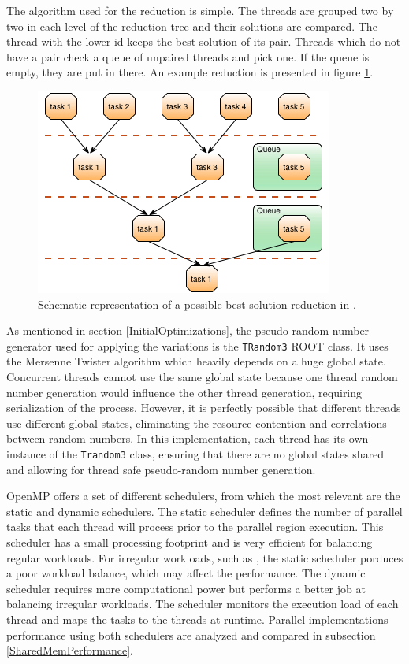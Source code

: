 The algorithm used for the reduction is simple. The threads are grouped two by two in each level of the reduction tree and their solutions are compared. The thread with the lower id keeps the best solution of its pair. Threads which do not have a pair check a queue of unpaired threads and pick one. If the queue is empty, they are put in there. An example reduction is presented in figure \ref{fig:Reduction}.

\begin{figure}[!htp]
	\begin{center}
		\includegraphics[scale=0.7]{../../common/img/parallel_reduction_example.png}
		\caption{Schematic representation of a possible best solution reduction in \ttDilepKinFit.}
		\label{fig:Reduction}
	\end{center}
\end{figure}

As mentioned in section \ref{InitialOptimizations}, the pseudo-random number generator used for applying the variations is the \texttt{TRandom3} ROOT class. It uses the Mersenne Twister algorithm which heavily depends on a huge global state. Concurrent threads cannot use the same global state because one thread random number generation would influence the other thread generation, requiring serialization of the process. However, it is perfectly possible that different threads use different global states, eliminating the resource contention and correlations between random numbers. In this implementation, each thread has its own instance of the \texttt{Trandom3} class, ensuring that there are no global states shared and allowing for thread safe pseudo-random number generation.

OpenMP offers a set of different schedulers, from which the most relevant are the static and dynamic schedulers. The static scheduler defines the number of parallel tasks that each thread will process prior to the parallel region execution. This scheduler has a small processing footprint and is very efficient for balancing regular workloads. For irregular workloads, such as \ttDilepKinFit, the static scheduler porduces a poor workload balance, which may affect the performance. The dynamic scheduler requires more computational power but performs a better job at balancing irregular workloads. The scheduler monitors the execution load of each thread and maps the tasks to the threads at runtime. Parallel implementations performance using both schedulers are analyzed and compared in subsection \ref{SharedMemPerformance}.


